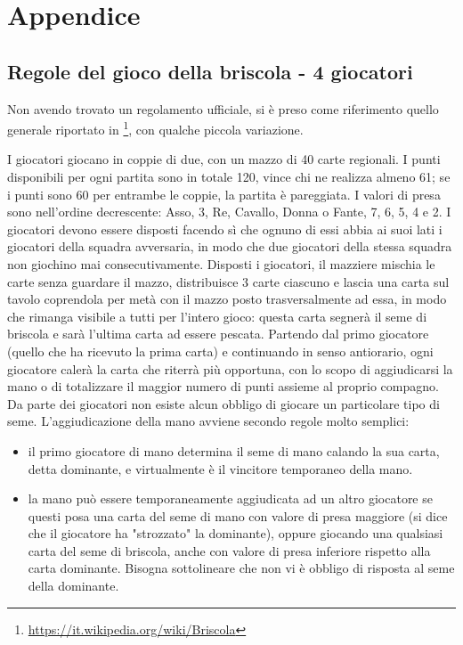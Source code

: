 \documentclass[a4paper,12pt]{article}
\begin{document}
\section*{Appendice}

\subsection*{Regole del gioco della briscola - 4 giocatori}\label{briscola-rules}

Non avendo trovato un regolamento ufficiale, si è preso come riferimento quello generale riportato in \footnote{\url{https://it.wikipedia.org/wiki/Briscola}}, con qualche piccola variazione.
 
I giocatori giocano in coppie di due, con un mazzo di 40 carte regionali. I punti disponibili per ogni partita sono in totale 120, vince chi ne realizza almeno 61; se i punti sono 60 per entrambe le coppie, la partita è pareggiata. I valori di presa sono nell'ordine decrescente: Asso, 3, Re, Cavallo, Donna o Fante, 7, 6, 5, 4 e 2. I giocatori devono essere disposti facendo sì che ognuno di essi abbia ai suoi lati i giocatori della squadra avversaria, in modo che due giocatori della stessa squadra non giochino mai consecutivamente. Disposti i giocatori, il mazziere mischia le carte senza guardare il mazzo, distribuisce 3 carte ciascuno e lascia una carta sul tavolo coprendola per metà con il mazzo posto trasversalmente ad essa, in modo che rimanga visibile a tutti per l'intero gioco: questa carta segnerà il seme di briscola e sarà l'ultima carta ad essere pescata. Partendo dal primo giocatore (quello che ha ricevuto la prima carta) e continuando in senso antiorario, ogni giocatore calerà la carta che riterrà più opportuna, con lo scopo di aggiudicarsi la mano o di totalizzare il maggior numero di punti assieme al proprio compagno. Da parte dei giocatori non esiste alcun obbligo di giocare un particolare tipo di seme. L'aggiudicazione della mano avviene secondo regole molto semplici:
\begin{itemize}
	\item il primo giocatore di mano determina il seme di mano calando la sua carta, detta dominante, e virtualmente è il vincitore temporaneo della mano.
	\item la mano può essere temporaneamente aggiudicata ad un altro giocatore se questi posa una carta del seme di mano con valore di presa maggiore (si dice che il giocatore ha "strozzato" la dominante), oppure giocando una qualsiasi carta del seme di briscola, anche con valore di presa inferiore rispetto alla carta dominante. Bisogna sottolineare che non vi è obbligo di risposta al seme della dominante.
\end{itemize}
\end{document}
